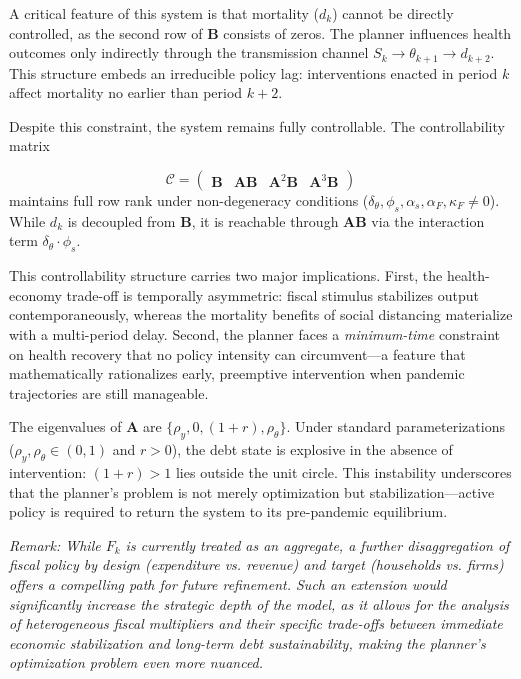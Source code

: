 A critical feature of this system is that mortality ($d_k$) cannot be directly controlled, as the second row of $\bm{B}$ consists of zeros. The planner influences health outcomes only indirectly through the transmission channel $S_k \to \theta_{k+1} \to d_{k+2}$. This structure embeds an irreducible policy lag: interventions enacted in period $k$ affect mortality no earlier than period $k+2$. 

\vspace{2mm}

\noindent Despite this constraint, the system remains fully controllable. The controllability matrix

\begin{equation}
    \mathcal{C} = \begin{pmatrix} \bm{B} & \bm{AB} & \bm{A}^2\bm{B} & \bm{A}^3\bm{B} \end{pmatrix}
\end{equation}
maintains full row rank under non-degeneracy conditions ($\delta_\theta, \phi_s, \alpha_s, \alpha_F, \kappa_F \neq 0$). While $d_k$ is decoupled from $\bm{B}$, it is reachable through $\bm{AB}$ via the interaction term $\delta_\theta \cdot \phi_s$. 

This controllability structure carries two major implications. First, the health-economy trade-off is temporally asymmetric: fiscal stimulus stabilizes output contemporaneously, whereas the mortality benefits of social distancing materialize with a multi-period delay. Second, the planner faces a \textit{minimum-time} constraint on health recovery that no policy intensity can circumvent—a feature that mathematically rationalizes early, preemptive intervention when pandemic trajectories are still manageable.

The eigenvalues of $\bm{A}$ are $\{\rho_y, 0, (1+r), \rho_\theta\}$. Under standard parameterizations ($\rho_y, \rho_\theta \in (0,1)$ and $r > 0$), the debt state is explosive in the absence of intervention: $(1+r) > 1$ lies outside the unit circle. This instability underscores 
that the planner's problem is not merely optimization but stabilization—active policy is required to return the system to its pre-pandemic equilibrium.

\vspace{5mm}

\textit{Remark: While $F_k$ is currently treated as an aggregate, a further disaggregation of fiscal policy by design (expenditure vs. revenue) and target (households vs. firms) offers a compelling path for future refinement. Such an extension would significantly increase the strategic depth of the model, as it allows for the analysis of heterogeneous fiscal multipliers and their specific trade-offs between immediate economic stabilization and long-term debt sustainability, making the planner's optimization problem even more nuanced.}

